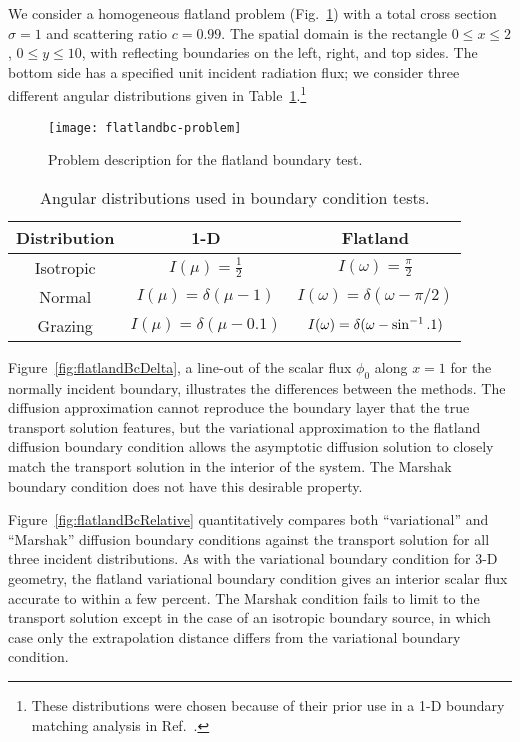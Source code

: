 We consider a homogeneous flatland problem (Fig.~\ref{fig:flatlandBcProblem})
with a
total cross section $\sigma=1$ and scattering ratio $c=0.99$. The spatial 
domain is the rectangle $0 \le x \le 2$, $0 \le y \le 10$, with
reflecting boundaries on the left,
right, and top sides. The bottom side has a specified unit incident radiation
flux; we consider three different angular
distributions given in Table~\ref{tab:angularDistributions}.\footnote{These
distributions were chosen because of their prior use in a 1-D boundary
matching analysis in Ref.~\cite{Dav2006}.}

\begin{figure}[htb]
  \centering
  \texttt{[image: flatlandbc-problem]}
  \caption{Problem description for the flatland boundary test.}
  \label{fig:flatlandBcProblem}
\end{figure}

\begin{table}[htb]
  \centering
  \begin{tabular}{ccc}
\toprule
    Distribution & 1-D & Flatland
\\ \midrule
Isotropic & $I(\mu) = \frac{1}{2}$ & $I(\omega) = \frac{\pi}{2}$
\\
Normal & $I(\mu) = \delta(\mu-1)$ & $I(\omega) = \delta(\omega-\pi/2)$
\\
Grazing & $I(\mu) = \delta(\mu-0.1)$ & $I(\omega) = \delta(\omega-\sin^{-1}.1)$
\\ \bottomrule
  \end{tabular}
  \caption{Angular distributions used in boundary condition tests.}
  \label{tab:angularDistributions}
\end{table}

Figure~\ref{fig:flatlandBcDelta},
 a line-out of the scalar flux $\phi_0$ along
$x=1$ for the normally incident boundary, illustrates the differences between
the methods. The diffusion
approximation cannot reproduce the boundary layer that the true transport
solution features, but the variational approximation to the flatland
diffusion boundary condition allows the asymptotic diffusion solution to
closely match the transport solution in the interior of the system. The Marshak
boundary condition does not have this desirable property.

Figure~\ref{fig:flatlandBcRelative} quantitatively compares both ``variational'' and
``Marshak'' diffusion boundary conditions against the transport solution
for all three incident distributions.  
As with the variational boundary condition for 3-D geometry, the flatland
variational boundary condition gives an interior scalar flux accurate to within
a few percent. The Marshak condition fails to limit to the transport solution except in
the case of an isotropic boundary source, in which case only the extrapolation
distance differs from the variational boundary condition.

